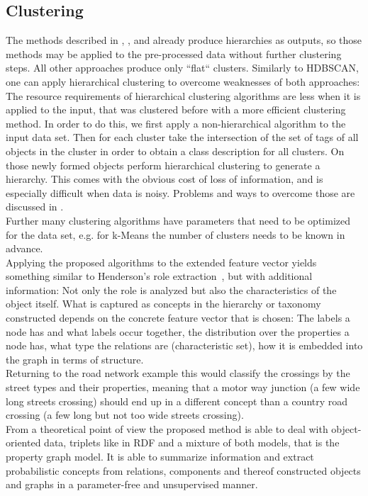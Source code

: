 \subsection{Clustering}\label{\positionnumber}
The methods described in , ,  and  already produce hierarchies as outputs, so those methods may be applied to the pre-processed data without further clustering steps. All other approaches produce only ``flat`` clusters. Similarly to HDBSCAN, one can apply hierarchical clustering to overcome weaknesses of both approaches: The resource requirements of hierarchical clustering algorithms are less when it is applied to the input, that was clustered before with a more efficient clustering method. In order to do this, we first apply a non-hierarchical algorithm to the input data set. Then for each cluster take the intersection of the set of tags of all objects in the cluster in order to obtain a class description for all clusters. On those newly formed objects perform hierarchical clustering to generate a hierarchy. This comes with the obvious cost of loss of information, and is especially difficult when data is noisy. Problems and ways to overcome those are discussed in . \\
Further many clustering algorithms have parameters that need to be optimized for the data set, e.g. for k-Means the number of clusters needs to be known in advance. \\

\noindent Applying the proposed algorithms to the extended feature vector yields something similar to Henderson's role extraction~\cite{henderson2012rolx}, but with additional information: Not only the role is analyzed but also the characteristics of the object itself. What is captured as concepts in the hierarchy or taxonomy constructed depends on the concrete feature vector that is chosen: The labels a node has and what labels occur together, the distribution over the properties a node has, what type the relations are (characteristic set), how it is embedded into the graph in terms of structure. \\
Returning to the road network example this would classify the crossings by the street types and their properties, meaning that a motor way junction (a few wide long streets crossing) should end up in a different concept than a country road crossing (a few long but not too wide streets crossing). \\
From a theoretical point of view the proposed method is able to deal with object-oriented data, triplets like in RDF and a mixture of both models, that is the property graph model. It is able to summarize information and extract probabilistic concepts from relations, components and thereof constructed objects and graphs in a parameter-free and unsupervised manner. 


